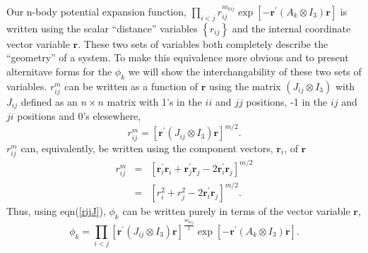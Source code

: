 \documentclass[12pt,thmsa]{article}
\begin{document}
Our n-body potential expansion function, $\prod_{i<j}r_{ij}^{m_{kij}}\exp %
\left[ -\mathbf{r}^{\prime }(A_k\otimes I_3)\mathbf{r}\right] $ is written
using the scalar ``distance'' variables $\left\{ r_{ij}\right\} $ and the
internal coordinate vector variable $\mathbf{r.}$ These two sets of
variables both completely describe the ``geometry'' of a system. To make
this equivalence more obvious and to present alternitave forms for the $\phi
_k$ we will show the interchangability of these two sets of variables. $%
r_{ij}^m$ can be written as a function of $\mathbf{r}$ using the matrix $%
\left( J_{ij}\otimes I_3\right) $ with $J_{ij}$ defined as an $n\times n$
matrix with 1's in the $ii$ and $jj$ positions, -1 in the $ij$ and $ji$
positions and 0's elesewhere\cite{Poshusta83,Kinghorn95a}, 
\begin{equation}
r_{ij}^m=\left[ \mathbf{r}^{\prime }(J_{ij}\otimes I_3)\mathbf{r}\right]
^{m/2}.  \label{rijJ}
\end{equation}
$r_{ij}^m$ can, equivalently, be written using the component vectors, $%
\mathbf{r}_i$, of $\mathbf{r}$ 
\begin{eqnarray}
r_{ij}^m &=&\left[ \mathbf{r}_i^{\prime }\mathbf{r}_i+\mathbf{r}_j^{\prime }%
\mathbf{r}_j-2\mathbf{r}_i^{\prime }\mathbf{r}_j\right] ^{m/2} \\
&=&\left[ r_i^2+r_j^2-2\mathbf{r}_i^{\prime }\mathbf{r}_j\right] ^{m/2}.
\end{eqnarray}
Thus, using eqn(\ref{rijJ}), $\phi _k$ can be written purely in terms of the
vector variable $\mathbf{r}$, 
\begin{equation}
\phi _k=\prod_{i<j}\left[ \mathbf{r}^{\prime }(J_{ij}\otimes I_3)\mathbf{r}%
\right] ^{\frac{m_{kij}}2}\exp \left[ -\mathbf{r}^{\prime }(A_k\otimes I_3)%
\mathbf{r}\right] .  \label{phir}
\end{equation}
\end{document}
